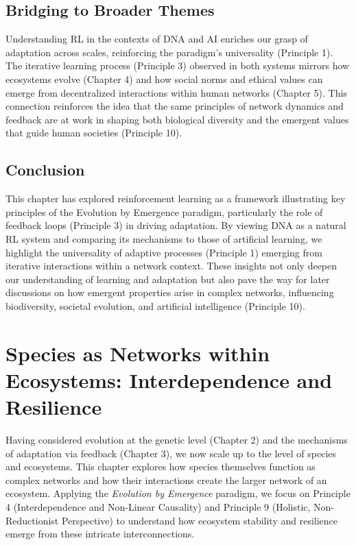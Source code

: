 \documentclass[12pt,openany]{book}
\let\cleardoublepage\clearpage %
\begin{document}
\section{Bridging to Broader Themes}
Understanding RL in the contexts of DNA and AI enriches our grasp of adaptation across scales, reinforcing the paradigm's universality (Principle 1). The iterative learning process (Principle 3) observed in both systems mirrors how ecosystems evolve (Chapter 4) and how social norms and ethical values can emerge from decentralized interactions within human networks (Chapter 5). This connection reinforces the idea that the same principles of network dynamics and feedback are at work in shaping both biological diversity and the emergent values that guide human societies (Principle 10). %

\section*{Conclusion}
This chapter has explored reinforcement learning as a framework illustrating key principles of the Evolution by Emergence paradigm, particularly the role of feedback loops (Principle 3) in driving adaptation. By viewing DNA as a natural RL system and comparing its mechanisms to those of artificial learning, we highlight the universality of adaptive processes (Principle 1) emerging from iterative interactions within a network context. These insights not only deepen our understanding of learning and adaptation but also pave the way for later discussions on how emergent properties arise in complex networks, influencing biodiversity, societal evolution, and artificial intelligence (Principle 10). %
\cleardoublepage

\chapter{Species as Networks within Ecosystems: Interdependence and Resilience} %
\label{ch:SpeciesNetworks}

Having considered evolution at the genetic level (Chapter 2) and the mechanisms of adaptation via feedback (Chapter 3), we now scale up to the level of species and ecosystems. This chapter explores how species themselves function as complex networks and how their interactions create the larger network of an ecosystem. Applying the \emph{Evolution by Emergence} paradigm, we focus on Principle 4 (Interdependence and Non-Linear Causality) and Principle 9 (Holistic, Non-Reductionist Perspective) to understand how ecosystem stability and resilience emerge from these intricate interconnections. %
\end{document}
